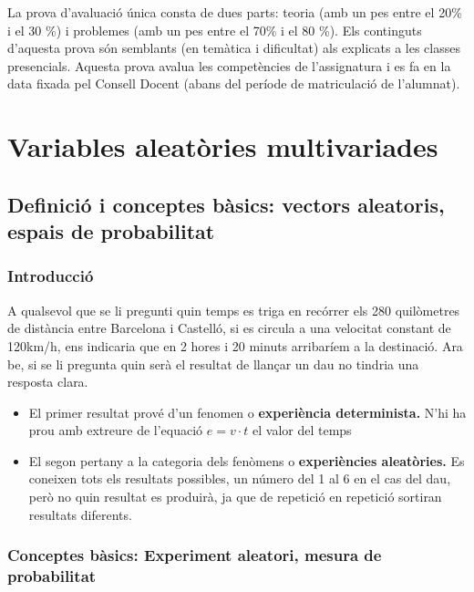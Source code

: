 \documentclass[
  catalan,
]{article}
\providecommand{\tightlist}{%
  \setlength{\itemsep}{0pt}\setlength{\parskip}{0pt}}
\theoremstyle{definition}
\theoremstyle{definition}
\theoremstyle{definition}
\theoremstyle{definition}
\theoremstyle{remark}
\begin{document}
La prova d'avaluació única consta de dues parts: teoria (amb un pes entre el 20\% i el 30 \%) i problemes (amb un pes entre el 70\% i el 80 \%). Els continguts d'aquesta prova són semblants (en temàtica i dificultat) als explicats a les classes presencials. Aquesta prova avalua les competències de l'assignatura i es fa en la data fixada pel Consell Docent (abans del període de matriculació de l'alumnat).

\newpage

\section{Variables aleatòries multivariades}\label{variables-aleatuxf2ries-multivariades}

\subsection{Definició i conceptes bàsics: vectors aleatoris, espais de probabilitat}\label{definiciuxf3-i-conceptes-buxe0sics-vectors-aleatoris-espais-de-probabilitat}

\subsubsection{Introducció}\label{introducciuxf3}

A qualsevol que se li pregunti quin temps es triga en recórrer els 280 quilòmetres de distància entre Barcelona i Castelló, si es circula a una velocitat constant de 120km/h, ens indicaria que en 2 hores i 20 minuts arribaríem a la destinació. Ara be, si se li pregunta quin serà el resultat de llançar un dau no tindria una resposta clara.

\begin{itemize}
\tightlist
\item
  El primer resultat prové d'un fenomen o \textbf{experiència determinista.} N'hi ha prou amb extreure de l'equació \(e=v·t\) el valor del temps
\item
  El segon pertany a la categoria dels fenòmens o \textbf{experiències aleatòries.} Es coneixen tots els resultats possibles, un número del 1 al 6 en el cas del dau, però no quin resultat es produirà, ja que de repetició en repetició sortiran resultats diferents.
\end{itemize}

\subsubsection{Conceptes bàsics: Experiment aleatori, mesura de probabilitat}\label{conceptes-buxe0sics-experiment-aleatori-mesura-de-probabilitat}
\end{document}
